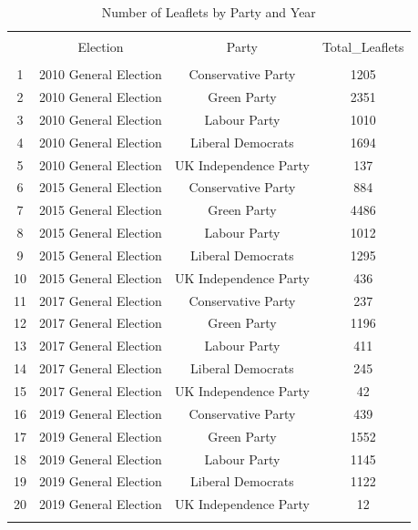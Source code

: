 \documentclass[preprint,12pt,authoryear]{elsarticle}
\begin{document}
\begin{table}[!htbp] \centering
  \caption{Number of Leaflets by Party and Year}
  \label{}
\begin{tabular}{@{\extracolsep{5pt}} cccc}
\\[-1.8ex]\hline
\hline \\[-1.8ex]
 & Election & Party & Total\_Leaflets \\ 
\hline \\[-1.8ex]
1 &  2010 General Election &  Conservative Party & 1205 \\
2 &  2010 General Election &  Green Party & 2351 \\ 
3 &  2010 General Election &  Labour Party & 1010 \\
4 &  2010 General Election &  Liberal Democrats & 1694 \\
5 &  2010 General Election &  UK Independence Party & 137 \\
6 &  2015 General Election &  Conservative Party & 884 \\ 
7 &  2015 General Election &  Green Party & 4486 \\
8 &  2015 General Election &  Labour Party & 1012 \\
9 &  2015 General Election &  Liberal Democrats & 1295 \\
10 &  2015 General Election &  UK Independence Party & 436 \\
11 &  2017 General Election &  Conservative Party & 237 \\ 
12 &  2017 General Election &  Green Party & 1196 \\
13 &  2017 General Election &  Labour Party & 411 \\
14 &  2017 General Election &  Liberal Democrats & 245 \\
15 &  2017 General Election &  UK Independence Party & 42 \\
16 &  2019 General Election &  Conservative Party & 439 \\
17 &  2019 General Election &  Green Party & 1552 \\ 
18 &  2019 General Election &  Labour Party & 1145 \\
19 &  2019 General Election &  Liberal Democrats & 1122 \\ 
20 &  2019 General Election &  UK Independence Party & 12 \\
\hline \\[-1.8ex]
\end{tabular}
\end{table}
\newpage
\end{document}

